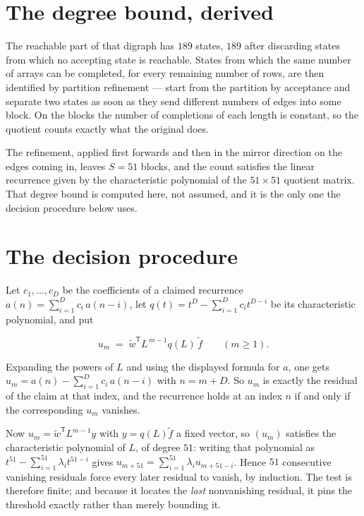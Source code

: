 \documentclass[11pt]{article}
\theoremstyle{definition}
\begin{document}
\section{The degree bound, derived}

The reachable part of that digraph has $189$ states, $189$ after discarding states from which no accepting state is reachable. States from which the same number of arrays can be completed, for every remaining number of rows, are then identified by partition refinement --- start from the partition by acceptance and separate two states as soon as they send different numbers of edges into some block. On the blocks the number of completions of each length is constant, so the quotient counts exactly what the original does.

The refinement, applied first forwards and then in the mirror direction on the edges coming in, leaves $S = 51$ blocks, and the count satisfies the linear recurrence given by the characteristic polynomial of the $51 \times 51$ quotient matrix. That degree bound is computed here, not assumed, and it is the only one the decision procedure below uses.

\section{The decision procedure}

Let $c_1,\dots,c_D$ be the coefficients of a claimed recurrence $a(n) = \sum_{i=1}^{D} c_i\,a(n-i)$, let $q(t) = t^{D} - \sum_{i=1}^{D} c_i t^{D-i}$ be its characteristic polynomial, and put

\[u_m \;=\; \tilde w^{\mathsf T} L^{\,m-1} q(L)\,\tilde f \qquad (m \ge 1).\]

Expanding the powers of $L$ and using the displayed formula for $a$, one gets $u_m = a(n) - \sum_{i=1}^{D} c_i\,a(n-i)$ with $n = m + D$. So $u_m$ is exactly the residual of the claim at that index, and the recurrence holds at an index $n$ if and only if the corresponding $u_m$ vanishes.

Now $u_m = \tilde w^{\mathsf T} L^{m-1} y$ with $y = q(L)\tilde f$ a fixed vector, so $(u_m)$ satisfies the characteristic polynomial of $L$, of degree $51$: writing that polynomial as $t^{51} - \sum_{i=1}^{51} \lambda_i t^{51-i}$ gives $u_{m+51} = \sum_{i=1}^{51} \lambda_i u_{m+51-i}$. Hence $51$ consecutive vanishing residuals force every later residual to vanish, by induction. The test is therefore finite; and because it locates the {\itshape last} nonvanishing residual, it pins the threshold exactly rather than merely bounding it.
\end{document}
